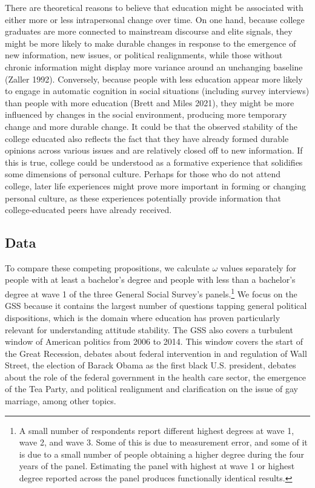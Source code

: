 \documentclass[
  11pt,
]{article}
\begin{document}
There are theoretical reasons to believe that education might be
associated with either more or less intrapersonal change over time. On
one hand, because college graduates are more connected to mainstream
discourse and elite signals, they might be more likely to make durable
changes in response to the emergence of new information, new issues, or
political realignments, while those without chronic information might
display more variance around an unchanging baseline (Zaller 1992).
Conversely, because people with less education appear more likely to
engage in automatic cognition in social situations (including survey
interviews) than people with more education (Brett and Miles 2021), they
might be more influenced by changes in the social environment, producing
more temporary change and more durable change. It could be that the
observed stability of the college educated also reflects the fact that
they have already formed durable opinions across various issues and are
relatively closed off to new information. If this is true, college could
be understood as a formative experience that solidifies some dimensions
of personal culture. Perhaps for those who do not attend college, later
life experiences might prove more important in forming or changing
personal culture, as these experiences potentially provide information
that college-educated peers have already received.

\subsection{Data}\label{data-1}

To compare these competing propositions, we calculate \(\omega\) values
separately for people with at least a bachelor's degree and people with
less than a bachelor's degree at wave 1 of the three General Social
Survey's panels.\footnote{A small number of respondents report different
  highest degrees at wave 1, wave 2, and wave 3. Some of this is due to
  measurement error, and some of it is due to a small number of people
  obtaining a higher degree during the four years of the panel.
  Estimating the panel with highest at wave 1 or highest degree reported
  across the panel produces functionally identical results.} We focus on
the GSS because it contains the largest number of questions tapping
general political dispositions, which is the domain where education has
proven particularly relevant for understanding attitude stability. The
GSS also covers a turbulent window of American politics from 2006 to
2014. This window covers the start of the Great Recession, debates about
federal intervention in and regulation of Wall Street, the election of
Barack Obama as the first black U.S. president, debates about the role
of the federal government in the health care sector, the emergence of
the Tea Party, and political realignment and clarification on the issue
of gay marriage, among other topics.
\end{document}
